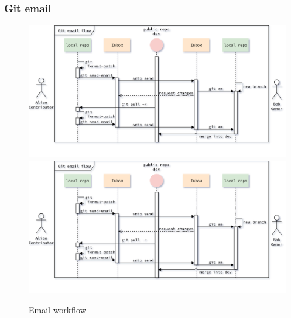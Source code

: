 \begin{frame}
    \frametitle{Git email}
    \begin{figure}
        \begin{center}
            {
                \includegraphics[height=0.7\textheight,keepaspectratio]{./images/EmailWorkflow_ApplyAndMerge.png}
            }
            {
                \includegraphics[height=0.75\textheight,keepaspectratio]{./images/EmailWorkflow_ApplyAndMerge.png}
            }
            \caption{Email workflow}
        \end{center}
    \end{figure}
\end{frame}

